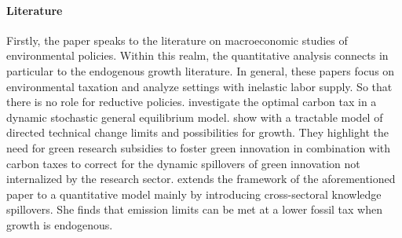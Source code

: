 \paragraph{Literature}

 


Firstly, the paper speaks to the literature on macroeconomic studies of environmental policies. Within this realm, the quantitative analysis connects in particular to the endogenous growth literature. 
In general, these papers focus on environmental taxation and analyze settings with inelastic labor supply. So that there is no role for reductive policies. \cite{Golosov2014OptimalEquilibrium} investigate the optimal carbon tax in a dynamic stochastic general equilibrium model.  
\cite{Acemoglu2012TheChange} show with a tractable model of directed technical change limits and possibilities for growth. They highlight the need for green research subsidies to foster green innovation in combination with carbon taxes to correct for the dynamic spillovers of green innovation not internalized by the research sector.
\cite{Fried2018ClimateAnalysis} extends the framework of the aforementioned paper to a quantitative model mainly by introducing cross-sectoral knowledge spillovers. She finds that emission limits can be met at a lower fossil tax when growth is endogenous.



